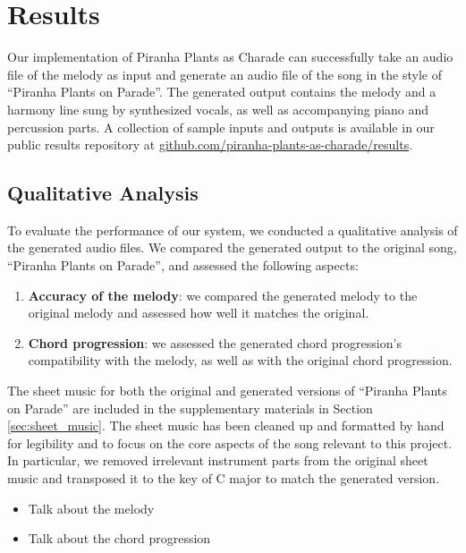 \section{Results}
\label{sec:results}

Our implementation of Piranha Plants as Charade can successfully take an audio file of the melody as input and generate an audio file of the song in the style of ``Piranha Plants on Parade''. The generated output contains the melody and a harmony line sung by synthesized vocals, as well as accompanying piano and percussion parts. A collection of sample inputs and outputs is available in our public results repository at \href{https://github.com/piranha-plants-as-charade/results/tree/ff597ce27f76daa1df1426bdfcb646833f433c2e}{github.com/piranha-plants-as-charade/results}.

\subsection{Qualitative Analysis}
\label{sec:qualitative_analysis}

To evaluate the performance of our system, we conducted a qualitative analysis of the generated audio files. We compared the generated output to the original song, ``Piranha Plants on Parade'', and assessed the following aspects:

\begin{enumerate}
    \item \textbf{Accuracy of the melody}: we compared the generated melody to the original melody and assessed how well it matches the original.
    \item \textbf{Chord progression}: we assessed the generated chord progression's compatibility with the melody, as well as with the original chord progression.
\end{enumerate}

The sheet music for both the original and generated versions of ``Piranha Plants on Parade'' are included in the supplementary materials in Section \ref{sec:sheet_music}. The sheet music has been cleaned up and formatted by hand for legibility and to focus on the core aspects of the song relevant to this project. In particular, we removed irrelevant instrument parts from the original sheet music and transposed it to the key of C major to match the generated version.

\begin{itemize}
    \item Talk about the melody
    \item Talk about the chord progression
\end{itemize}
